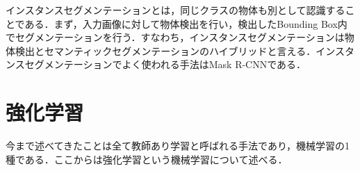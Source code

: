 インスタンスセグメンテーションとは，同じクラスの物体も別として認識することである．まず，入力画像に対して物体検出を行い，検出したBounding Box内でセグメンテーションを行う．すなわち，インスタンスセグメンテーションは物体検出とセマンティックセグメンテーションのハイブリッドと言える．インスタンスセグメンテーションでよく使われる手法はMask R-CNNである\cite{Mask_R-CNN}．




\section{強化学習}\label{sec:強化学習}
今まで述べてきたことは全て教師あり学習と呼ばれる手法であり，機械学習の1種である．ここからは強化学習という機械学習について述べる．


